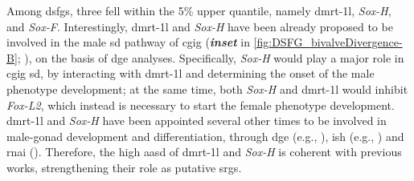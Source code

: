 Among \glspl{dsfg}, three fell within the 5\% upper quantile, namely \gls{dmrt-1l}, \textit{Sox-H}, and \textit{Sox-F}. Interestingly, \gls{dmrt-1l} and \textit{Sox-H} have been already proposed to be involved in the male \gls{sd} pathway of \gls{cgig} (\textbf{\textit{inset}} in \cref{fig:DSFG_bivalveDivergence-B}; ), on the basis of \gls{dge} analyses. Specifically, \textit{Sox-H} would play a major role in \gls{cgig} \gls{sd}, by interacting with \gls{dmrt-1l} and determining the onset of the male phenotype development; at the same time, both \textit{Sox-H} and \gls{dmrt-1l} would inhibit \textit{Fox-L2}, which instead is necessary to start the female phenotype development. \gls{dmrt-1l} and \textit{Sox-H} have been appointed several other times to be involved in male-gonad development and differentiation, through \gls{dge} (e.g., ), \gls{ish} (e.g., ) and \gls{rnai} (). Therefore, the high \gls{aasd} of \gls{dmrt-1l} and \textit{Sox-H} is coherent with previous works, strengthening their role as putative \glspl{srg}.

